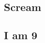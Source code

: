 \documentclass[a4paper]{article}
\begin{document}
\subsection{Scream}

\subsection{I am 9}
\end{document}
